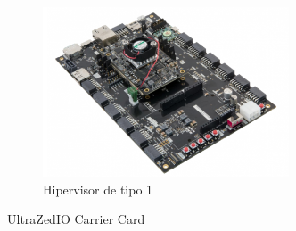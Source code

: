 \begin{figure}[h]
	\centering
	\includegraphics[width=0.65\textwidth]{recursos/ultrazed-eg-carrier.png}
	\caption{Hipervisor de tipo 1}
	\label{fig:ultrazed-eg-carrier}
\end{figure}

UltraZed\texttrademark IO Carrier Card
